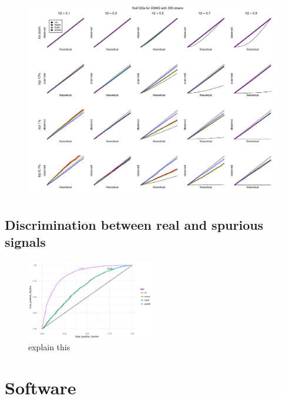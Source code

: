 \begin{figure}
  \includegraphics[width = \textwidth]{images/2018-05-19alt_heterosked_sims_nstrain=200_nsnps=100_nsims=10000.pdf}
\end{figure}


\subsection{Discrimination between real and spurious signals}

\begin{figure}
  \centering
  \includegraphics[width = 0.5\textwidth]{images/roc_hetsked_100snps_1ksims_05h2_100strains.pdf}
  \caption{explain this}
  \label{fig:exampleROC}
\end{figure}


\section{Software}